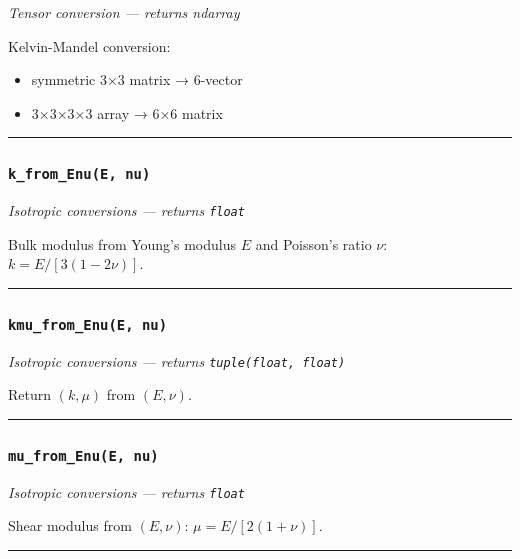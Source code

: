 \documentclass[
  a4paper,
  numbers=noendperiod,
  DIV=12]{scrreprt}
\providecommand{\tightlist}{%
  \setlength{\itemsep}{0pt}\setlength{\parskip}{0pt}}
\begin{document}
\emph{Tensor conversion --- returns ndarray}

Kelvin-Mandel conversion:

\begin{itemize}
\tightlist
\item
  symmetric 3×3 matrix → 6-vector
\item
  3×3×3×3 array → 6×6 matrix
\end{itemize}

\begin{center}\rule{0.5\linewidth}{0.5pt}\end{center}

\subsubsection{\texorpdfstring{\texttt{k\_from\_Enu(E,\ nu)}}{k\_from\_Enu(E, nu)}}\label{api-k-from-Enu}

\emph{Isotropic conversions --- returns \texttt{float}}

Bulk modulus from Young's modulus \(E\) and Poisson's ratio \(\nu\):
\(k = E / [3(1-2\nu)]\).

\begin{center}\rule{0.5\linewidth}{0.5pt}\end{center}

\subsubsection{\texorpdfstring{\texttt{kmu\_from\_Enu(E,\ nu)}}{kmu\_from\_Enu(E, nu)}}\label{api-kmu-from-Enu}

\emph{Isotropic conversions --- returns \texttt{tuple(float,\ float)}}

Return \((k,\mu)\) from \((E,\nu)\).

\begin{center}\rule{0.5\linewidth}{0.5pt}\end{center}

\subsubsection{\texorpdfstring{\texttt{mu\_from\_Enu(E,\ nu)}}{mu\_from\_Enu(E, nu)}}\label{api-mu-from-Enu}

\emph{Isotropic conversions --- returns \texttt{float}}

Shear modulus from \((E,\nu)\): \(\mu = E / [2(1+\nu)]\).

\begin{center}\rule{0.5\linewidth}{0.5pt}\end{center}
\end{document}

